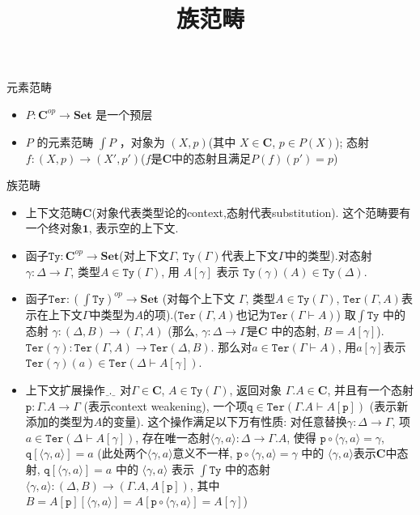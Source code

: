 \documentclass[aspectratio=169,xcolor=dvipsnames]{beamer}
\title{族范畴}
\date{}
\newcommand\Ty{\mathtt{Ty}}
\newcommand\Ter{\mathtt{Ter}}
\newcommand\ttp{\mathtt{p}}
\newcommand\ttq{\mathtt{q}}
\newcommand\bfone{\mathbf{1}}
\newcommand\Set{\mathbf{Set}}
\newcommand\C{\mathbf{C}}
\newcommand\extop{{\scalebox{0.4}[1]{\_}}.{\scalebox{0.4}[1]{\_}}}
\begin{document}
\begin{frame}
    \titlepage
\end{frame}

\begin{frame}{元素范畴}
  \begin{itemize}
    \item $P : \C^{op} \to \Set$ 是一个预层 \pause
    \item $P$ 的元素范畴 $\int P$ \pause，对象为 $(X,p)$\pause(其中 $X\in\C$, $p\in P(X)$); \pause 态射 $f : (X,p)\to(X',p')$\pause($f$是$\C$中的态射且满足$P(f)(p')=p$)
  \end{itemize}
\end{frame}

\begin{frame}[shrink]{族范畴}
\begin{itemize}
  \item 上下文范畴$\C$\pause(对象代表类型论的context,态射代表substitution). \pause 这个范畴要有一个终对象$\bfone$, 表示空的上下文.
  \item 函子$\Ty:\C^{op}\to\Set$\pause (对上下文$\Gamma$, $\Ty(\Gamma)$代表上下文$\Gamma$中的类型).\pause 对态射$\gamma:\Delta\to\Gamma$, 类型$A\in\Ty(\Gamma)$, 用 $A[\gamma]$ 表示 $\Ty(\gamma)(A)\in\Ty(\Delta)$.\pause
  \item 函子$\Ter:(\int\Ty)^{op}\to\Set$ (对每个上下文 $\Gamma$, 类型$A\in\Ty(\Gamma)$, $\Ter(\Gamma,A)$表示在上下文$\Gamma$中类型为$A$的项).\pause ($\Ter(\Gamma,A)$也记为$\Ter(\Gamma\vdash A)$) \pause 取$\int\Ty$ 中的态射 $\gamma:(\Delta,B)\to(\Gamma,A)$ \pause(那么, $\gamma:\Delta\to\Gamma$是$\C$ 中的态射, $B=A[\gamma]$). \pause $\Ter(\gamma):\Ter(\Gamma,A)\to\Ter(\Delta,B)$. 那么对$a\in\Ter(\Gamma\vdash A)$, 用$a[\gamma]$表示$\Ter(\gamma)(a)\in\Ter(\Delta\vdash A[\gamma])$.\pause
  \item 上下文扩展操作$\extop$ \pause 对$\Gamma\in\C$, $A\in\Ty(\Gamma)$, 返回对象 $\Gamma.A\in\C$, 并且有一个态射$\ttp:\Gamma.A\to\Gamma$ \pause (表示context weakening), \pause 一个项$\ttq\in\Ter(\Gamma.A\vdash A[\ttp])$ \pause (表示新添加的类型为$A$的变量). \pause 这个操作满足以下万有性质: 对任意替换$\gamma:\Delta\to\Gamma$, 项 $a\in\Ter(\Delta\vdash A[\gamma])$, 存在唯一态射$\langle\gamma,a\rangle:\Delta\to\Gamma.A$, 使得 $\ttp\circ\langle\gamma,a\rangle=\gamma$, $\ttq[\langle\gamma,a\rangle]=a$ \pause (此处两个$\langle\gamma,a\rangle$意义不一样, $\ttp\circ\langle\gamma,a\rangle=\gamma$ 中的 $\langle\gamma,a\rangle$表示$\C$中态射, $\ttq[\langle\gamma,a\rangle]=a$ 中的 $\langle\gamma,a\rangle$ 表示 $\int\Ty$ 中的态射 $\langle\gamma,a\rangle : (\Delta,B)\to (\Gamma.A,A[\ttp])$, 其中 $B=A[\ttp][\langle\gamma,a\rangle]=A[\ttp\circ\langle\gamma,a\rangle]=A[\gamma]$)
\end{itemize}
\end{frame}
\end{document}
